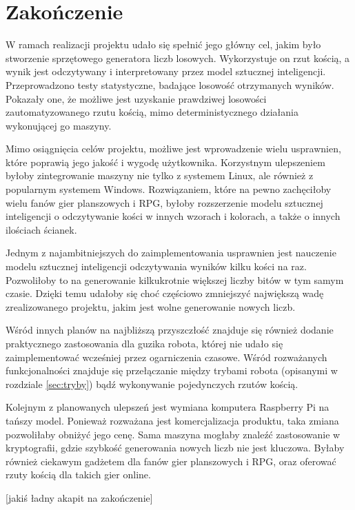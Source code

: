 
\chapter{Zakończenie}\label{ch:zakonczenie}

W ramach realizacji projektu udało się spełnić jego główny cel, jakim było stworzenie sprzętowego generatora liczb losowych.
Wykorzystuje on rzut kością, a wynik jest odczytywany i interpretowany przez model sztucznej inteligencji. Przeprowadzono
testy statystyczne, badające losowość otrzymanych wyników. Pokazały one, że możliwe jest uzyskanie prawdziwej losowości 
zautomatyzowanego rzutu kością, mimo deterministycznego działania wykonującej go maszyny.

Mimo osiągnięcia celów projektu, możliwe jest wprowadzenie wielu usprawnien, które poprawią jego jakość i wygodę użytkownika.
Korzystnym ulepszeniem byłoby zintegrowanie maszyny nie tylko z systemem Linux, ale również z popularnym systemem
Windows. Rozwiązaniem, które na pewno zachęciłoby wielu fanów gier planszowych i RPG, byłoby rozszerzenie modelu 
sztucznej inteligencji o odczytywanie kości w innych wzorach i kolorach, a także o innych ilościach ścianek.

Jednym z najambitniejszych do zaimplementowania usprawnien jest nauczenie modelu sztucznej inteligencji odczytywania 
wyników kilku kości na raz. Pozwoliłoby to na generowanie kilkukrotnie większej liczby bitów w tym samym czasie. Dzięki
temu udałoby się choć częściowo zmniejszyć największą wadę zrealizowanego projektu, jakim jest wolne generowanie nowych
liczb.

Wśród innych planów na najbliższą przyszczłość znajduje się również dodanie praktycznego zastosowania dla guzika robota,
której nie udało się zaimplementować wcześniej przez ogarniczenia czasowe. Wśród rozważanych funkcjonalności znajduje się
przełączanie między trybami robota (opisanymi w rozdziale \ref{sec:tryby}) bądź wykonywanie pojedynczych rzutów kością.

Kolejnym z planowanych ulepszeń jest wymiana komputera Raspberry Pi na tańszy model. Ponieważ rozważana jest komercjalizacja
produktu, taka zmiana pozwoliłaby obniżyć jego cenę. Sama maszyna mogłaby znaleźć zastosowanie w kryptografii, gdzie 
szybkość generowania nowych liczb nie jest kluczowa. Byłaby również ciekawym gadżetem dla fanów gier planszowych i RPG,
oraz oferować rzuty kością dla takich gier online.

[jakiś ładny akapit na zakończenie]


